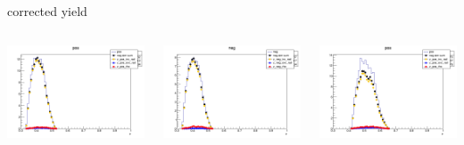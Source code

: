 \begin{frame}{corrected yield}
\begin{columns}
\begin{column}[T]{0.25\textwidth}
\includegraphics[width = \textwidth]{results/yield/statistics_corr/yield_x_Q2_z_0.50_5.000_0.40_pos.png}
\end{column}
\begin{column}[T]{0.25\textwidth}
\includegraphics[width = \textwidth]{results/yield/statistics_corr/yield_x_Q2_z_0.50_5.000_0.40_neg.png}
\end{column}
\begin{column}[T]{0.25\textwidth}
\includegraphics[width = \textwidth]{results/yield/statistics_corr/yield_x_Q2_z_0.50_5.000_0.50_pos.png}

\end{column}
\end{columns}
\end{frame}
